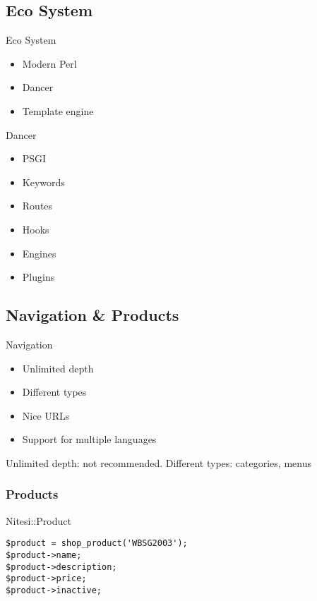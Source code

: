\subsection{Eco System}

\begin{frame}{Eco System}
\begin{itemize}
\item Modern Perl
\item Dancer
\item Template engine
\end{itemize}
\end{frame}

\begin{frame}{Dancer}
\begin{itemize}
\item PSGI
\item Keywords
\item Routes
\item Hooks
\item Engines
\item Plugins
\end{itemize}
\end{frame}

\subsection{Navigation \& Products}
\begin{frame}{Navigation}
\begin{itemize}
\item Unlimited depth
\item Different types
\item Nice URLs
\item Support for multiple languages
\end{itemize}
\end{frame}

Unlimited depth: not recommended.
Different types: categories, menus

\subsubsection{Products}
\begin{frame}[fragile]{Nitesi::Product}
\begin{lstlisting}
$product = shop_product('WBSG2003');
$product->name;
$product->description;
$product->price;
$product->inactive;
\end{lstlisting}
\end{frame}

